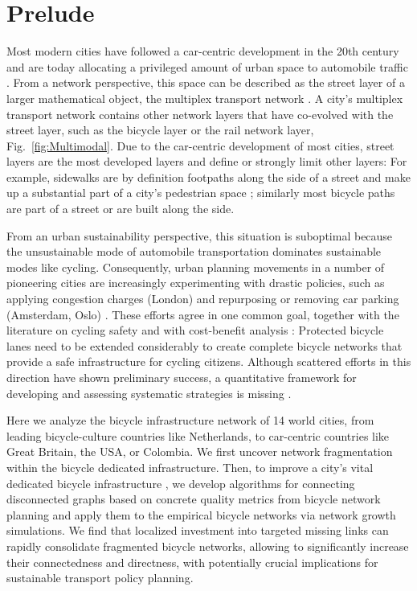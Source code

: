 \section{Prelude}
Most modern cities have followed a car-centric development in the 20th century \cite{Jacobs1961Death} and are today allocating a privileged amount of urban space to automobile traffic \cite{Gossling2016Space,Szell2018Crowdsourced}. From a network perspective, this space can be described as the street layer of a larger mathematical object, the multiplex transport network \cite{Morris2012Transport,Strano2015Features,Aleta2017Multilayer}. A city's multiplex transport network contains other network layers that have co-evolved with the street layer, such as the bicycle layer or the rail network layer, Fig.~\ref{fig:Multimodal}. Due to the car-centric development of most cities, street layers are the most developed layers and define or strongly limit other layers: For example, sidewalks are by definition footpaths along the side of a street and make up a substantial part of a city's pedestrian space \cite{Gossling2016Space}; similarly most bicycle paths are part of a street or are built along the side.

From an urban sustainability perspective, this situation is suboptimal because the unsustainable mode of automobile transportation dominates sustainable modes like cycling. Consequently, urban planning movements in a number of pioneering cities are increasingly experimenting with drastic policies, such as applying congestion charges (London) \cite{Eliasson2008Lessons} and repurposing or removing car parking (Amsterdam, Oslo) \cite{Littke2016parklets,bliss2019hcp,Nieuwenhuijsen2016Car}. These efforts agree in one common goal, together with the literature on cycling safety \cite{Reynolds2009impact,Teschke2012route,Pucher2016Safer,aldred2018cycling} and with cost-benefit analysis \cite{gossling2019social}: Protected bicycle lanes need to be extended considerably to create complete bicycle networks that provide a safe infrastructure for cycling citizens. Although scattered efforts in this direction have shown preliminary success, a quantitative framework for developing and assessing systematic strategies is missing \cite{Gossling2020Cities}.

Here we analyze the bicycle infrastructure network of 14 world cities, from leading bicycle-culture countries like Netherlands, to car-centric countries like Great Britain, the USA, or Colombia. We first uncover network fragmentation within the bicycle dedicated infrastructure. Then, to improve a city's vital dedicated bicycle infrastructure \cite{Dill2013Bicycle,Schoner2014Missing,Hull2014Infrastructure,Buehler2016Bikable}, we develop algorithms for connecting disconnected graphs based on concrete quality metrics from bicycle network planning \cite{Twaddell2018Multimodal} and apply them to the empirical bicycle networks via network growth simulations. We find that localized investment into targeted missing links can rapidly consolidate fragmented bicycle networks, allowing to significantly increase their connectedness and directness, with potentially crucial implications for sustainable transport policy planning.

